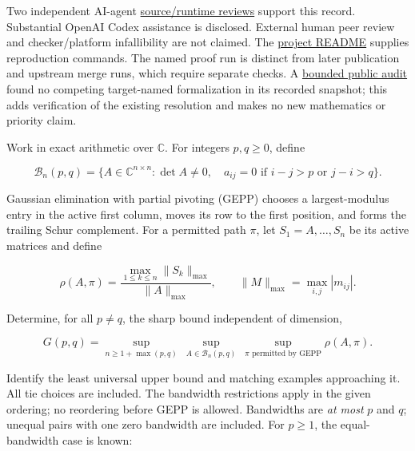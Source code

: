 \documentclass[11pt,a4paper]{article}
\makeatletter
\renewcommand{\subsection}{\Needspace{4\baselineskip}\@startsection{subsection}{2}{0pt}{9pt plus 1pt minus 1pt}{3pt}{\sffamily\bfseries\normalsize\color{ink}}}
\makeatother
\begin{document}
Two independent AI-agent
\href{https://github.com/ajt60gaibb/OpenProblemsInNLA/blob/main/linear-systems-and-elimination/IE-13/lean/reviews/final/README.md}{source/runtime
reviews} support this record. Substantial OpenAI Codex assistance is
disclosed. External human peer review and checker/platform infallibility
are not claimed. The
\href{https://github.com/ajt60gaibb/OpenProblemsInNLA/blob/main/linear-systems-and-elimination/IE-13/lean/README.md}{project
README} supplies reproduction commands. The named proof run is distinct
from later publication and upstream merge runs, which require separate
checks. A
\href{https://github.com/ajt60gaibb/OpenProblemsInNLA/blob/main/linear-systems-and-elimination/IE-13/lean/verification/publication-2026-09-16/public-duplicate-audit/SCOPE.json}{bounded
public audit} found no competing target-named formalization in its
recorded snapshot; this adds verification of the existing resolution and
makes no new mathematics or priority claim.

\subsection{Problem statement}\label{problem-statement}

Work in exact arithmetic over \(\mathbb C\). For integers \(p,q\ge0\),
define

\[\mathcal B_n(p,q)=\{A\in\mathbb C^{n\times n}:\det A\ne0,\quad
a_{ij}=0\text{ if }i-j>p\text{ or }j-i>q\}.\]

Gaussian elimination with partial pivoting (GEPP) chooses a
largest-modulus entry in the active first column, moves its row to the
first position, and forms the trailing Schur complement. For a permitted
path \(\pi\), let \(S_1=A,\ldots,S_n\) be its active matrices and define

\[\rho(A,\pi)=\frac{\max_{1\le k\le n}\|S_k\|_{\max}}{\|A\|_{\max}},
\qquad \|M\|_{\max}=\max_{i,j}|m_{ij}|.\]

Determine, for all \(p\ne q\), the sharp bound independent of dimension,

\[G(p,q)=\sup_{n\ge1+\max(p,q)}\ \sup_{A\in\mathcal B_n(p,q)}\
\sup_{\pi\text{ permitted by GEPP}}\rho(A,\pi).\]

Identify the least universal upper bound and matching examples
approaching it. All tie choices are included. The bandwidth restrictions
apply in the given ordering; no reordering before GEPP is allowed.
Bandwidths are \emph{at most} \(p\) and \(q\); unequal pairs with one
zero bandwidth are included. For \(p\ge1\), the equal-bandwidth case is
known:
\end{document}
